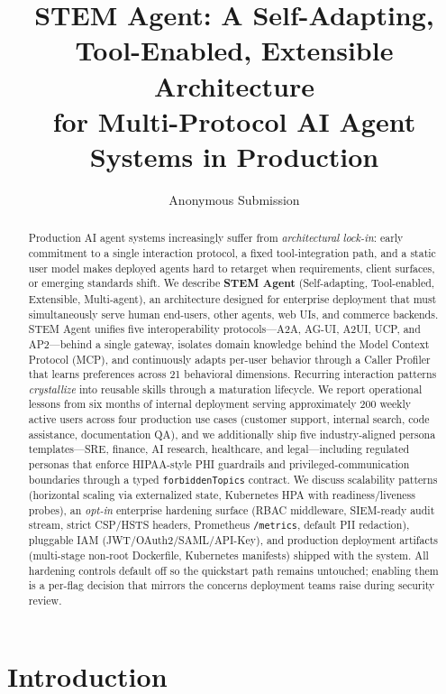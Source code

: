 \documentclass[11pt]{article}
\title{STEM Agent: A Self-Adapting, Tool-Enabled, Extensible Architecture\\
for Multi-Protocol AI Agent Systems in Production}
\author{Anonymous Submission}
\begin{document}
\maketitle

\begin{abstract}
Production AI agent systems increasingly suffer from \emph{architectural lock-in}: early commitment to a single interaction protocol, a fixed tool-integration path, and a static user model makes deployed agents hard to retarget when requirements, client surfaces, or emerging standards shift. We describe \textbf{STEM Agent} (Self-adapting, Tool-enabled, Extensible, Multi-agent), an architecture designed for enterprise deployment that must simultaneously serve human end-users, other agents, web UIs, and commerce backends. STEM Agent unifies five interoperability protocols---A2A, AG-UI, A2UI, UCP, and AP2---behind a single gateway, isolates domain knowledge behind the Model Context Protocol (MCP), and continuously adapts per-user behavior through a Caller Profiler that learns preferences across 21 behavioral dimensions. Recurring interaction patterns \emph{crystallize} into reusable skills through a maturation lifecycle. We report operational lessons from six months of internal deployment serving approximately 200 weekly active users across four production use cases (customer support, internal search, code assistance, documentation QA), and we additionally ship five industry-aligned persona templates---SRE, finance, AI research, healthcare, and legal---including regulated personas that enforce HIPAA-style PHI guardrails and privileged-communication boundaries through a typed \texttt{forbiddenTopics} contract. We discuss scalability patterns (horizontal scaling via externalized state, Kubernetes HPA with readiness/liveness probes), an \emph{opt-in} enterprise hardening surface (RBAC middleware, SIEM-ready audit stream, strict CSP/HSTS headers, Prometheus \texttt{/metrics}, default PII redaction), pluggable IAM (JWT/OAuth2/SAML/API-Key), and production deployment artifacts (multi-stage non-root Dockerfile, Kubernetes manifests) shipped with the system. All hardening controls default off so the quickstart path remains untouched; enabling them is a per-flag decision that mirrors the concerns deployment teams raise during security review.
\end{abstract}

\section{Introduction}
\label{sec:intro}
\end{document}
